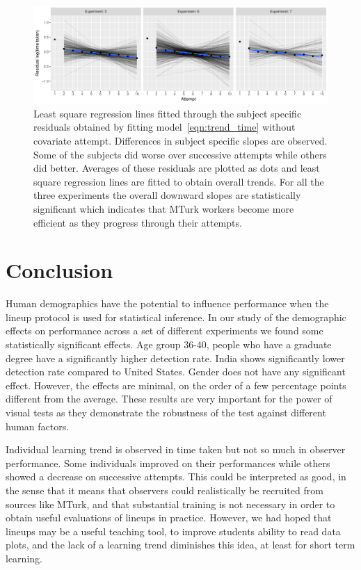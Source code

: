 \documentclass[10pt]{article}\usepackage[]{graphicx}\usepackage[]{xcolor}
\begin{document}
\begin{figure}[htbp] 
   \centering
 \includegraphics[width=6.3in]{learning_trend_time_subject.pdf}    
   \caption{Least square regression lines fitted through the subject specific residuals obtained by  fitting model~\eqref{eqn:trend_time} without covariate attempt. Differences in subject specific slopes are observed. Some of the subjects did worse over successive attempts while others did better. Averages of these residuals are plotted as dots and least square regression lines are fitted to obtain overall trends. For all the three experiments the overall downward slopes are statistically significant which indicates that MTurk workers become more efficient as they progress through their attempts.}
   \label{fig:learning_trend_time}
\end{figure}



\section{Conclusion}

Human demographics have the potential to influence performance when the lineup protocol is used for statistical inference. In our study of the demographic effects on performance across a set of different experiments we found some statistically significant effects. Age group 36-40, people who have a graduate degree have a significantly higher detection rate. India shows significantly lower detection rate compared to United States. Gender does not have any significant effect. However, the effects are minimal, on the order of a few percentage points different from the average. These results are very important for the power of visual tests as they demonstrate the robustness of the test against different human factors.

Individual learning trend is observed in time taken but not so much in observer performance. Some individuals improved on their performances while others showed a decrease on successive attempts. This could be interpreted as good, in the sense that it means that observers could realistically be recruited from sources like MTurk, and that substantial training is not necessary in order to obtain useful evaluations of lineups in practice. However, we had hoped that lineups may be a useful teaching tool, to improve students ability to read data plots, and the lack of a learning trend diminishes this idea, at least for short term learning. 
\end{document}
